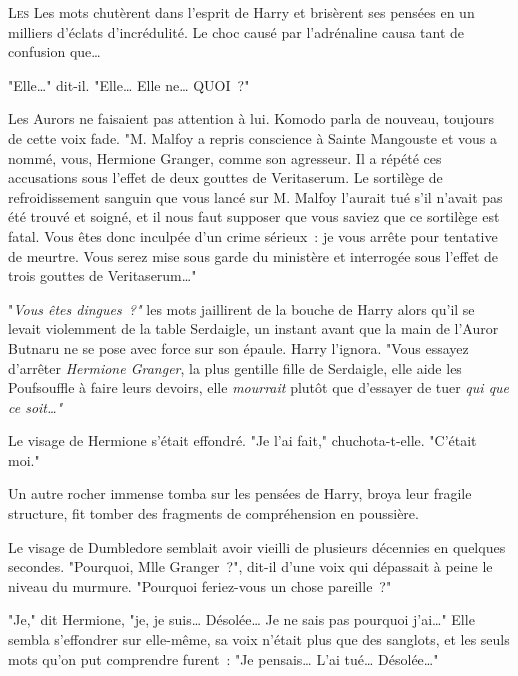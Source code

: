 
\lettrine{L}{es} Les mots chutèrent dans l'esprit de Harry et brisèrent ses pensées en un milliers d'éclats d'incrédulité. Le choc causé par l'adrénaline causa tant de confusion que…

"Elle…" dit-il. "Elle… Elle ne… QUOI~?"

Les Aurors ne faisaient pas attention à lui. Komodo parla de nouveau, toujours de cette voix fade. "M. Malfoy a repris conscience à Sainte Mangouste et vous a nommé, vous, Hermione Granger, comme son agresseur. Il a répété ces accusations sous l'effet de deux gouttes de Veritaserum. Le sortilège de refroidissement sanguin que vous lancé sur M. Malfoy l'aurait tué s'il n'avait pas été trouvé et soigné, et il nous faut supposer que vous saviez que ce sortilège est fatal. Vous êtes donc inculpée d'un crime sérieux~: je vous arrête pour tentative de meurtre. Vous serez mise sous garde du ministère et interrogée sous l'effet de trois gouttes de Veritaserum…"

"\emph{Vous êtes dingues~?"} les mots jaillirent de la bouche de Harry alors qu'il se levait violemment de la table Serdaigle, un instant avant que la main de l'Auror Butnaru ne se pose avec force sur son épaule. Harry l'ignora. "Vous essayez d'arrêter \emph{Hermione Granger}, la plus gentille fille de Serdaigle, elle aide les Poufsouffle à faire leurs devoirs, elle \emph{mourrait} plutôt que d'essayer de tuer \emph{qui que ce soit…"}

Le visage de Hermione s'était effondré. "Je l'ai fait," chuchota-t-elle. "C'était moi."

Un autre rocher immense tomba sur les pensées de Harry, broya leur fragile structure, fit tomber des fragments de compréhension en poussière.

Le visage de Dumbledore semblait avoir vieilli de plusieurs décennies en quelques secondes. "Pourquoi, Mlle Granger~?", dit-il d'une voix qui dépassait à peine le niveau du murmure. "Pourquoi feriez-vous un chose pareille~?"

"Je," dit Hermione, "je, je suis… Désolée… Je ne sais pas pourquoi j'ai…" Elle sembla s'effondrer sur elle-même, sa voix n'était plus que des sanglots, et les seuls mots qu'on put comprendre furent~: "Je pensais… L'ai tué… Désolée…"

